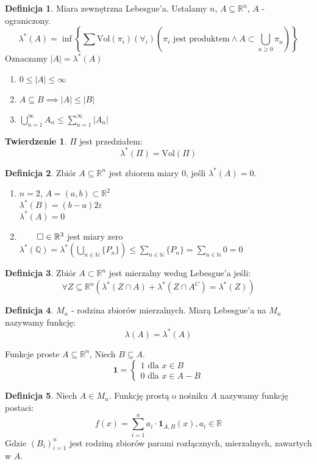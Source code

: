 \documentclass{article}
\theoremstyle{definition}
\newtheorem{de}{Definicja}[subsection]
\theoremstyle{definition}
\newtheorem{tw}{Twierdzenie}[subsection]
\theoremstyle{definition}
\theoremstyle{definition}
\begin{document}
\begin{de}
    Miara zewnętrzna Lebesgue'a. Ustalamy $n$, $A\subseteq \mathbb{R}^n$, $A$ - ograniczony.
    \[\lambda^{*}(A) = \inf \left\{\sum \text{Vol}(\pi_i) \left(\forall_i \right)(\pi_i \text{ jest produktem} \land A\subset \bigcup_{n\geq 0} \pi_n)\right\}\]
    Oznaczamy $|A|=\lambda^{*}(A)$
\end{de}

\begin{enumerate}
    \item $0 \leq |A| \leq \infty$
    \item $A\subseteq B \implies |A| \leq |B|$
    \item $\bigcup_{n=1}^{\infty} A_n \leq \sum_{n=1}^{\infty} |A_n|$
\end{enumerate}

\begin{tw}
    $\Pi$ jest przedziałem:
    \[\lambda^{*}(\Pi) = \text{Vol}(\Pi)\]
\end{tw}

\begin{de}
    Zbiór $A\subseteq \mathbb{R}^n$ jest zbiorem miary 0, jeśli $\lambda^{*}(A)=0$.
    \begin{enumerate}
        \item $n=2$, $A = (a,b) \subset \mathbb{R}^2$\\
        $\lambda^{*}(B)=(b-a)2\varepsilon$\\
        $\lambda^{*}(A)=0$
        \item $\qed\in \mathbb{R}^3$ jest miary zero\\
        $\lambda^{*}(\mathbb{Q})=\lambda^{*}(\bigcup_{n\in\mathbb{N}} \{P_n\}) \leq \sum_{n\in\mathbb{N}} \{P_n\} = \sum_{n\in\mathbb{N}} 0 = 0$
    \end{enumerate}
\end{de}

\begin{de}
    Zbiór $A\subset \mathbb{R}^n$ jest mierzalny wedug Lebesgue'a jeśli:
    \[\forall Z\subseteq \mathbb{R}^n \left(\lambda^{*}(Z\cap A) + \lambda^{*}(Z\cap A^C) = \lambda^{*}(Z)\right)\]
\end{de}

\begin{de}
    $M_n$ - rodzina zbiorów mierzalnych. Miarą Lebesgue'a na $M_n$ nazywamy funkcję:
    \[\lambda(A) = \lambda^{*}(A)\]
\end{de}
Funkcje proste $A\subseteq \mathbb{R}^n$, Niech $B\subseteq A$.
\[
\textbf{1} =
\begin{cases}
    1 \text{ dla } x\in B\\
    0 \text{ dla } x\in A-B
\end{cases}
\]

\begin{de}
    Niech $A\in M_n$. Funkcję prostą o nośniku $A$ nazywamy funkcję postaci:
    \[ f(x) = \sum_{i=1}^{n} a_i \cdot \textbf{1}_{A,B} (x), a_i\in\mathbb{R}\]
    Gdzie $(B_i)_{i=1}^{n}$ jest rodziną zbiorów parami rozłącznych, mierzalnych, zawartych w $A$.
\end{de}
\end{document}
